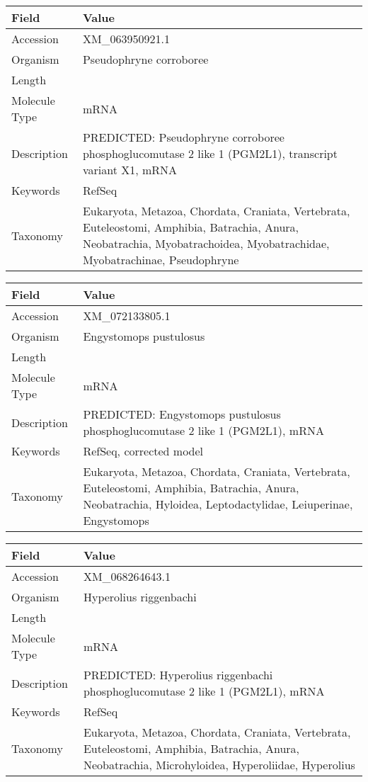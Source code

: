\documentclass[10pt]{article}
\begin{document}
{\footnotesize
\begin{longtable}{>{\raggedright\arraybackslash}p{4.5cm} >{\raggedright\arraybackslash}p{11.5cm}}
\textbf{Field} & \textbf{Value} \\
\hline
Accession & XM\_063950921.1 \\
Organism & Pseudophryne corroboree \\
Length & 7603 \\
Molecule Type & mRNA \\
Description & PREDICTED: Pseudophryne corroboree phosphoglucomutase 2 like 1 (PGM2L1), transcript variant X1, mRNA \\
Keywords & RefSeq \\
Taxonomy & Eukaryota, Metazoa, Chordata, Craniata, Vertebrata, Euteleostomi, Amphibia, Batrachia, Anura, Neobatrachia, Myobatrachoidea, Myobatrachidae, Myobatrachinae, Pseudophryne \\
\end{longtable}
}

{\footnotesize
\begin{longtable}{>{\raggedright\arraybackslash}p{4.5cm} >{\raggedright\arraybackslash}p{11.5cm}}
\textbf{Field} & \textbf{Value} \\
\hline
Accession & XM\_072133805.1 \\
Organism & Engystomops pustulosus \\
Length & 7004 \\
Molecule Type & mRNA \\
Description & PREDICTED: Engystomops pustulosus phosphoglucomutase 2 like 1 (PGM2L1), mRNA \\
Keywords & RefSeq, corrected model \\
Taxonomy & Eukaryota, Metazoa, Chordata, Craniata, Vertebrata, Euteleostomi, Amphibia, Batrachia, Anura, Neobatrachia, Hyloidea, Leptodactylidae, Leiuperinae, Engystomops \\
\end{longtable}
}

{\footnotesize
\begin{longtable}{>{\raggedright\arraybackslash}p{4.5cm} >{\raggedright\arraybackslash}p{11.5cm}}
\textbf{Field} & \textbf{Value} \\
\hline
Accession & XM\_068264643.1 \\
Organism & Hyperolius riggenbachi \\
Length & 3385 \\
Molecule Type & mRNA \\
Description & PREDICTED: Hyperolius riggenbachi phosphoglucomutase 2 like 1 (PGM2L1), mRNA \\
Keywords & RefSeq \\
Taxonomy & Eukaryota, Metazoa, Chordata, Craniata, Vertebrata, Euteleostomi, Amphibia, Batrachia, Anura, Neobatrachia, Microhyloidea, Hyperoliidae, Hyperolius \\
\end{longtable}
}
\end{document}
